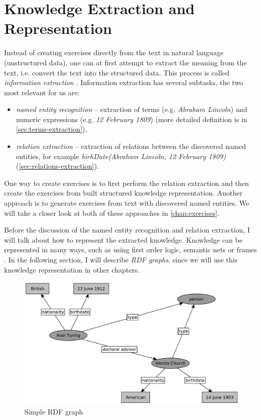 \documentclass[12pt, twoside]{fithesis2}
\renewcommand{\_}{\leavevmode \kern0.07em\vbox{\hrule width0.4em}}
\newcommand{\squarebullet}{\textcolor{black}{\raisebox{0.15em}{\rule{4pt}{4pt}}}}
\newcommand{\emptysquarebullet}{\textcolor{black}{\raisebox{0.10em}{\tiny$\square$}}}
\newenvironment{myItemize}{
  \begin{itemize}[leftmargin=2em,rightmargin=1em,itemsep=\parskip ,parsep=0em,topsep=0em,partopsep=0em]
  \renewcommand{\labelitemi}{\squarebullet}
  \renewcommand{\labelitemii}{\textbullet}
}{
  \end{itemize}
}
\begin{document}
\chapter{Knowledge Extraction and Representation}
\label{chap:knowledge}

Instead of creating exercises directly from the text in natural language (unstructured data),
one can at first attempt to extract the meaning from the text,
i.e. convert the text into the structured data.
This process is called \textit{information extraction} \cite[][262]{nlp-python}.
Information extraction has several subtasks, the two most relevant for us are:
\begin{myItemize}
  \item \textit{named entity recognition} -- extraction of terms (e.g. \textit{Abraham Lincoln}) and numeric expressions (e.g. \emph{12 February 1809}) (more detailed definition is in \autoref{sec:terms-extraction}),
  \item \textit{relation extraction} -- extraction of relations between the discovered named entities,
    for example \emph{birhDate(Abraham Lincoln, 12 February 1809)}
    (\autoref{sec:relations-extraction}).
\end{myItemize}

One way to create exercises is to first perform the relation extraction and then create the exercises from built structured knowledge representation. Another approach is to generate exercises from text with discovered named entities. We will take a closer look at both of these approaches in \autoref{chap:exercises}.

Before the discussion of the named entity recognition and relation extraction,
I will talk about how to represent the extracted knowledge.
Knowledge can be represented in many ways,
such as using first order logic, semantic nets or frames \cite{knowledge-representation}.
In the following section, I will describe \emph{RDF graphs},
since we will use this knowledge representation in other chapters.

\begin{figure}[h]
  \centering
  \includegraphics[width=\textwidth]{images/rdf-graph.pdf}
  \caption{Simple RDF graph}
  \label{fig:simple-rdf-graph}
\end{figure}
\end{document}
